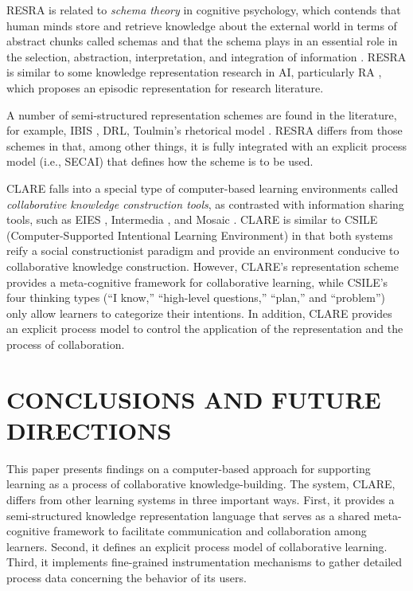 RESRA is related to {\it schema theory\/} in cognitive psychology, which
contends that human minds store and retrieve knowledge about the external
world in terms of abstract chunks called schemas \cite{Stillings87} and
that the schema plays in an essential role in the selection, abstraction,
interpretation, and integration of information \cite{Alba83}.  RESRA is
similar to some knowledge representation research in AI, particularly RA
\cite{Swaminathan90}, which proposes an episodic representation for
research literature.

A number of semi-structured representation schemes are found in the
literature, for example, IBIS \cite{Kunz70,Conklin88}, DRL\cite{Lee91What},
Toulmin's rhetorical model \cite{Toulmin58,Cavalli-Sforza92}.  RESRA
differs from those schemes in that, among other things, it is fully
integrated with an explicit process model (i.e., SECAI) that defines how
the scheme is to be used.

CLARE falls into a special type of computer-based learning environments
called {\it collaborative knowledge construction tools\/}, as contrasted
with information sharing tools, such as EIES \cite{Hiltz88}, Intermedia
\cite{Yankelovich88}, and Mosaic \cite{Andreessen93}. CLARE is similar to
CSILE (Computer-Supported Intentional Learning Environment)
\cite{Scardamadia93,Scardamadia92} in that both systems reify a social
constructionist paradigm and provide an environment conducive to
collaborative knowledge construction. However, CLARE's representation
scheme provides a meta-cognitive framework for collaborative learning,
while CSILE's four thinking types (``I know,'' ``high-level questions,''
``plan,'' and ``problem'') only allow learners to categorize their
intentions. In addition, CLARE provides an explicit process model to
control the application of the representation and the process of
collaboration.


\section{CONCLUSIONS AND FUTURE DIRECTIONS}
\label{sec:conclusions}

This paper presents findings on a computer-based approach for supporting
learning as a process of collaborative knowledge-building.  The system,
CLARE, differs from other learning systems in three important ways. First,
it provides a semi-structured knowledge representation language that serves
as a shared meta-cognitive framework to facilitate communication and
collaboration among learners. Second, it defines an explicit process model
of collaborative learning. Third, it implements fine-grained
instrumentation mechanisms to gather detailed process data concerning the
behavior of its users.

